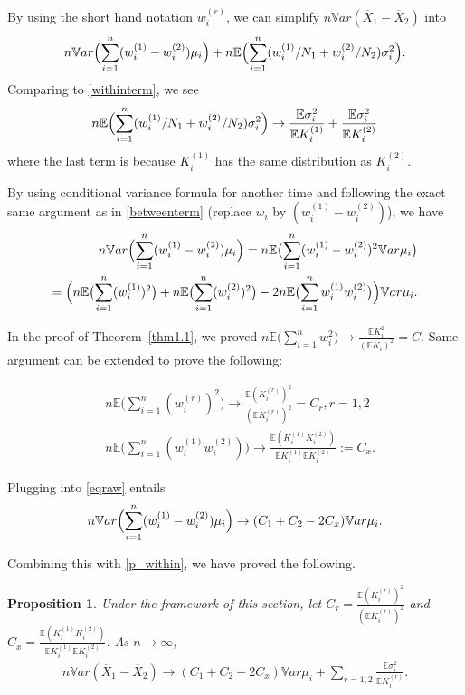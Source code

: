 \documentclass[11pt]{asaproc}
\newcommand{\var}{\ensuremath{\mathbb Var}}
\newcommand{\bbe}{\mathbb{E}}
\newcommand{\xbar}{\overline{X}}
\newtheorem{prop}[thm]{Proposition}
\begin{document}
By using the short hand notation $w_i^{(r)}$, we can simplify $n\var (\xbar_1-\xbar_2)  $ into 
\begin{align}
n\var\Bigl( \sum_{i=1}^n (w_i^{(1)}-w_i^{(2)})\mu_i\Bigr) + n\bbe \Bigl( \sum_{i=1}^n (w_i^{(1)}/N_1+w_i^{(2)}/N_2)\sigma_i^2\Bigr).
\end{align}
Comparing to \eqref{withinterm}, we see
\begin{align}
n\bbe \Bigl( \sum_{i=1}^n (w_i^{(1)}/N_1+w_i^{(2)}/N_2)\sigma_i^2\Bigr) \to \frac{\bbe \sigma_i^2}{\bbe K_i^{(1)}}+ \frac{\bbe \sigma_i^2}{\bbe K_i^{(2)}}  \label{p_within}
\end{align}
where the last term is because $K_i^{(1)}$ has the same distribution as $K_i^{(2)}$. 


By using conditional variance formula for another time and following the exact same argument as in \eqref{betweenterm} (replace $w_i$ by $(w_i^{(1)}-w_i^{(2)})$), we have
\begin{align}\label{eqraw}
n\var\Bigl( \sum_{i=1}^n (w_i^{(1)}-w_i^{(2)})\mu_i\Bigr) = n\bbe \bigl( \sum_{i=1}^n (w_i^{(1)}-w_i^{(2)})^2 \var \mu_i\bigr) \notag \\
= \Bigl( n\bbe \bigl (\sum_{i=1}^n (w_i^{(1)})^2\bigr)+ n\bbe \bigl (\sum_{i=1}^n (w_i^{(2)})^2\bigr)-2 n\bbe\bigl( \sum_{i=1}^n w_i^{(1)}w_i^{(2)}\bigr)\Bigl) \var \mu_i.
\end{align}

In the proof of Theorem~\ref{thm1.1}, we proved $n\bbe \bigl (\sum_{i=1}^n w_i^2\bigr)\to \frac{\bbe K_i^2}{(\bbe K_i)^2} = C$. Same argument can be extended to prove the following:

\begin{align*}
&n\bbe \bigl (\sum_{i=1}^n (w_i^{(r)})^2\bigr)\to \frac{\bbe (K_i^{(r)})^2}{(\bbe K_i^{(r)})^2} = C_r, r=1,2\\
&n\bbe \bigl (\sum_{i=1}^n (w_i^{(1)}w_i^{(2)})\bigr)\to \frac{\bbe (K_i^{(1)}K_i^{(2)})}{\bbe K_i^{(1)}\bbe K_i^{(2)}}:= C_x.
\end{align*}

Plugging into \eqref{eqraw} entails
\begin{align}\label{p_between}
n\var\Bigl( \sum_{i=1}^n (w_i^{(1)}-w_i^{(2)})\mu_i\Bigr) \to  (C_1+C_2-2C_x) \var \mu_i.
\end{align}


Combining this with \eqref{p_within}, we have proved the following.
\begin{prop}\label{p_prop2}
Under the framework of this section, let $C_r = \frac{\bbe (K_i^{(r)})^2}{(\bbe K_i^{(r)})^2}$ and $C_x = \frac{\bbe (K_i^{(1)}K_i^{(2)})}{\bbe K_i^{(1)}\bbe K_i^{(2)}}$. As $n\to \infty$,
\begin{align}\label{p_truevar}
n\var(\xbar_1-\xbar_2) \to (C_1+C_2-2C_x) \var \mu_i + \sum_{r=1,2} \frac{\bbe \sigma_i^2}{\bbe K_i^{(r)}}.
\end{align}
\end{prop}
\end{document}
